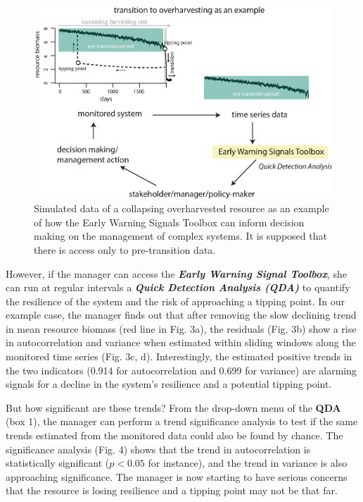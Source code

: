 \documentclass[12pt,a4paper,final]{article}
\begin{document}
\begin{doublespacing}
\begin{figure}[h]
\begin{center}
\includegraphics[scale=0.75]{figure_workflow.eps}
\caption{Simulated data of a collapsing overharvested resource as an example of how the Early Warning Signals Toolbox can inform decision making on the management of complex systems. It is supposed that there is access only to pre-transition data.}
\end{center}
\label{fig:data}
\end{figure}

However, if the manager can access the \textbf{\textit{Early Warning Signal Toolbox}}, she can run at regular intervals a \textbf{\textit{Quick Detection Analysis (QDA)}} to quantify the resilience of the system and the risk of approaching a tipping point. In our example case, the manager finds out that after removing the slow declining trend in mean resource biomass (red line in Fig. 3a), the residuals (Fig. 3b) show a rise in autocorrelation and variance when estimated within sliding windows along the monitored time series (Fig. 3c, d). %
Interestingly, the estimated positive trends in the two indicators (0.914 for autocorrelation and 0.699 for variance) are alarming signals for a decline in the system's resilience and a potential tipping point.

But how significant are these trends? From the drop-down menu of the \textbf{QDA} (box 1), the manager can perform a trend significance analysis to test if the same trends estimated from the monitored data could also be found by chance. The significance analysis (Fig. 4) shows that the trend in autocorrelation is statistically significant (\(p<0.05\) for instance), and the trend in variance is also approaching significance. The manager is now starting to have serious concerns that the resource is losing resilience and a tipping point may not be that far.


\end{doublespacing}
\end{document}
